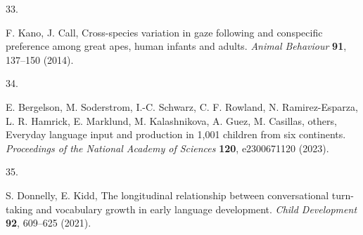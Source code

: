\documentclass[
  man,floatsintext]{apa6}
\newlength{\cslhangindent}
\newlength{\csllabelwidth}
\newlength{\cslentryspacingunit} %
\newenvironment{CSLReferences}[2] %
 {%
  \setlength{\parindent}{0pt}
  \ifodd #1
  \let\oldpar\par
  \def\par{\hangindent=\cslhangindent\oldpar}
  \fi
  \setlength{\parskip}{#2\cslentryspacingunit}
 }%
 {}
\newcommand{\CSLLeftMargin}[1]{\parbox[t]{\csllabelwidth}{#1}}
\newcommand{\CSLRightInline}[1]{\parbox[t]{\linewidth - \csllabelwidth}{#1}\break}
\begin{document}
\begin{CSLReferences}{0}{0}
\leavevmode{}%
\CSLLeftMargin{33. }%
\CSLRightInline{F. Kano, J. Call, Cross-species variation in gaze following and conspecific preference among great apes, human infants and adults. \emph{Animal Behaviour} \textbf{91}, 137--150 (2014).}

\leavevmode{}%
\CSLLeftMargin{34. }%
\CSLRightInline{E. Bergelson, M. Soderstrom, I.-C. Schwarz, C. F. Rowland, N. Ramirez-Esparza, L. R. Hamrick, E. Marklund, M. Kalashnikova, A. Guez, M. Casillas, others, Everyday language input and production in 1,001 children from six continents. \emph{Proceedings of the National Academy of Sciences} \textbf{120}, e2300671120 (2023).}

\leavevmode{}%
\CSLLeftMargin{35. }%
\CSLRightInline{S. Donnelly, E. Kidd, The longitudinal relationship between conversational turn-taking and vocabulary growth in early language development. \emph{Child Development} \textbf{92}, 609--625 (2021).}

\end{CSLReferences}
\end{document}
